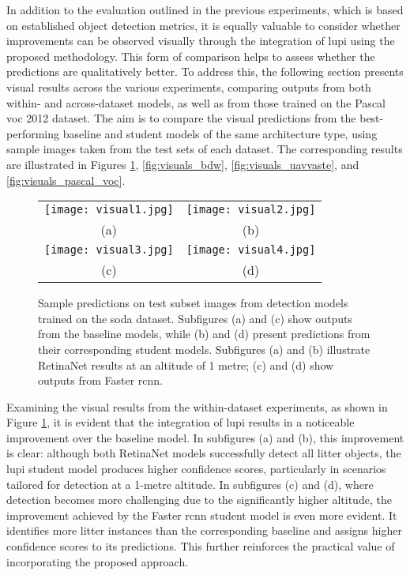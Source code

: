 In addition to the evaluation outlined in the previous experiments, which is based on established object detection metrics, it is equally valuable to consider whether improvements can be observed visually through the integration of \gls{lupi} using the proposed methodology. This form of comparison helps to assess whether the predictions are qualitatively better. To address this, the following section presents visual results across the various experiments, comparing outputs from both within- and across-dataset models, as well as from those trained on the Pascal \gls{voc} 2012 dataset. 
The aim is to compare the visual predictions from the best-performing baseline and student models of the same architecture type, using sample images taken from the test sets of each dataset. The corresponding results are illustrated in Figures \ref{fig:visuals_soda}, \ref{fig:visuals_bdw}, \ref{fig:visuals_uavvaste}, and \ref{fig:visuals_pascal_voc}.

\begin{figure}[!ht]
  \centering
  \begin{tabular}{cc}
    \texttt{[image: visual1.jpg]} &
    \texttt{[image: visual2.jpg]} \\
    \small (a) & \small (b) \\
    \addlinespace[1em]
    \texttt{[image: visual3.jpg]} &
    \texttt{[image: visual4.jpg]} \\
    \small (c) & \small (d) \\
  \end{tabular}
  \caption{Sample predictions on test subset images from detection models trained on the \gls{soda} dataset. Subfigures (a) and (c) show outputs from the baseline models, while (b) and (d) present predictions from their corresponding student models. Subfigures (a) and (b) illustrate RetinaNet results at an altitude of 1 metre; (c) and (d) show outputs from Faster \gls{rcnn}.}
  \label{fig:visuals_soda}
\end{figure}

Examining the visual results from the within-dataset experiments, as shown in Figure \ref{fig:visuals_soda}, it is evident that the integration of \gls{lupi} results in a noticeable improvement over the baseline model. In subfigures (a) and (b), this improvement is clear: although both RetinaNet models successfully detect all litter objects, the \gls{lupi} student model produces higher confidence scores, particularly in scenarios tailored for detection at a 1-metre altitude.
In subfigures (c) and (d), where detection becomes more challenging due to the significantly higher altitude, the improvement achieved by the Faster \gls{rcnn} student model is even more evident. It identifies more litter instances than the corresponding baseline and assigns higher confidence scores to its predictions. This further reinforces the practical value of incorporating the proposed approach.


